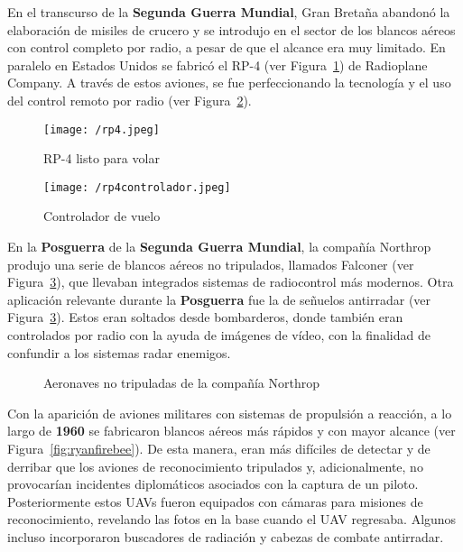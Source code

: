 En el transcurso de la \textbf{Segunda Guerra Mundial}, Gran Bretaña abandonó la elaboración de misiles de crucero y se introdujo en el sector de los blancos aéreos con control completo por radio, a pesar de que el alcance era muy limitado.
En paralelo en Estados Unidos se fabricó el RP-4 (ver Figura~\ref{fig:rp4}) de Radioplane Company. A través de estos aviones, se fue perfeccionando la tecnología y el uso del control remoto por radio (ver Figura~\ref{fig:controlador}).

\begin{figure}[!h]
\begin{center}
\texttt{[image: /rp4.jpeg]}
\caption[RP-4 listo para volar]{RP-4 listo para volar}
\label{fig:rp4}
\end{center}
\end{figure}


\begin{figure}[!h]
\begin{center}
\texttt{[image: /rp4controlador.jpeg]}
\caption[Controlador de vuelo]{Controlador de vuelo}
\label{fig:controlador}
\end{center}
\end{figure}

En la \textbf{Posguerra} de la \textbf{Segunda Guerra Mundial}, la compañía Northrop produjo una serie de blancos aéreos no tripulados, llamados Falconer (ver Figura~\ref{fig:northrop}), que llevaban integrados sistemas de radiocontrol más modernos. 
Otra aplicación relevante durante la \textbf{Posguerra} fue la de señuelos antirradar (ver Figura~\ref{fig:northrop}). Estos eran soltados desde bombarderos, donde también eran controlados por radio con la ayuda de imágenes de vídeo, con la finalidad de confundir a los sistemas radar enemigos.

\begin{figure}[!h]
\begin{center}
\caption[Aeronaves no tripuladas de la compañía Northrop]{Aeronaves no tripuladas de la compañía Northrop}
\label{fig:northrop}
\end{center}
\end{figure}

Con la aparición de aviones militares con sistemas de propulsión a reacción, a lo largo de \textbf{1960}
se fabricaron blancos aéreos más rápidos y con mayor alcance (ver Figura~\ref{fig:ryanfirebee}). De esta manera, eran más difíciles de detectar y de derribar que los aviones de reconocimiento tripulados y, adicionalmente, no provocarían incidentes diplomáticos asociados con la captura de un piloto. 
Posteriormente estos \acs{UAV}s fueron equipados con cámaras para misiones de reconocimiento, revelando las fotos en la base cuando el \acs{UAV} regresaba. Algunos incluso incorporaron buscadores de radiación y cabezas de combate antirradar.

